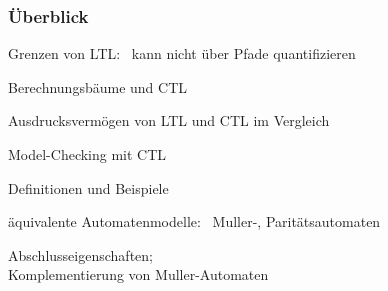 
\setcounter{part}{4}




  \begin{frame}
    \titlepage
  \end{frame}

  \begin{frame}
    \frametitle{Überblick}

    \begin{Itemize}
      \item
        Grenzen von LTL:~
        kann nicht über Pfade quantifizieren
        \par\smallskip
      \item
        Berechnungsbäume und CTL
        \par\smallskip
      \item
        Ausdrucksvermögen von LTL und CTL im Vergleich
        \par\smallskip
      \item
        Model-Checking mit CTL
    \end{Itemize}

    \par\bigskip
    \begin{Itemize}
      \item
        Definitionen und Beispiele
        \par\smallskip
      \item
        äquivalente Automatenmodelle:~ Muller-, Paritätsautomaten
        \par\smallskip
      \item
        Abschlusseigenschaften;\\
        Komplementierung von Muller-Automaten~~\Danger
    \end{Itemize}

  \end{frame}

